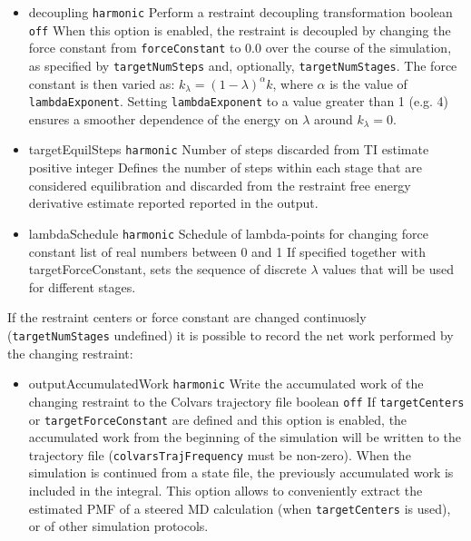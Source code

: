 \begin{itemize}
    \item %
    \keydef
    {decoupling}{%
      \texttt{harmonic}}{%
      Perform a restraint decoupling transformation}{%
      boolean}{%
    \texttt{off}}{%
    When this option is enabled, the restraint is decoupled by changing the force constant
    from \texttt{forceConstant} to 0.0 over the course of the simulation, as specified
    by \texttt{targetNumSteps} and, optionally, \texttt{targetNumStages}.
    The force constant is then varied as:
    $ k_\lambda = (1 - \lambda)^\alpha k$,
    where $\alpha$ is the value of \texttt{lambdaExponent}.
    Setting \texttt{lambdaExponent} to a value greater than 1 (e.g. 4) ensures a smoother
    dependence of the energy on $\lambda$ around $k_\lambda = 0$.}

\item %
  \key
    {targetEquilSteps}{%
    \texttt{harmonic}}{%
    Number of steps discarded from TI estimate}{%
    positive integer}{%
    Defines the number of steps within each stage that are considered
    equilibration and discarded from the restraint free energy derivative
    estimate reported reported in the output.}

\item %
  \key
    {lambdaSchedule}{%
    \texttt{harmonic}}{%
    Schedule of lambda-points for changing force constant}{%
    list of real numbers between 0 and 1}{%
    If specified together with targetForceConstant, sets the sequence of
    discrete $\lambda$ values that will be used for different stages.
  }

\end{itemize}



If the restraint centers or force constant are changed continuosly (\texttt{targetNumStages} undefined) it is possible to record the net work performed by the changing restraint:
\begin{itemize}
\item %
  \keydef
    {outputAccumulatedWork}{%
    \texttt{harmonic}}{%
    Write the accumulated work of the changing restraint to the Colvars trajectory file}{%
    boolean}{%
    \texttt{off}}{%
    If \texttt{targetCenters} or \texttt{targetForceConstant} are defined and this option is enabled, the accumulated work from the beginning of the simulation will be written to the trajectory file (\texttt{colvarsTrajFrequency} must be non-zero).
    When the simulation is continued from a state file, the previously accumulated work is included in the integral.
    This option allows to conveniently extract the estimated PMF of a steered MD calculation (when \texttt{targetCenters} is used), or of other simulation protocols.
}
\end{itemize}


